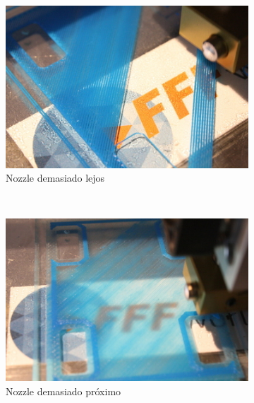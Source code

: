 \documentclass[11pt,a4paper]{article}
\begin{document}
\begin{figure}[H]
    \centering
    \begin{subfigure}[b]{0.3\textwidth}
        \includegraphics[width=\textwidth,cfbox=azul_marcos 3pt 0pt]{FOTOS/HOTENDALTO}
	\caption*{Nozzle demasiado lejos}
    \end{subfigure}
    ~ %
    \begin{subfigure}[b]{0.3\textwidth}
        \includegraphics[width=\textwidth,cfbox=azul_marcos 3pt 0pt]{FOTOS/HOTENDBAJO}
	\caption*{Nozzle demasiado próximo}
    \end{subfigure}
    ~ %
    \begin{subfigure}[b]{0.3\textwidth}

\end{subfigure}
\end{figure}
\end{document}
